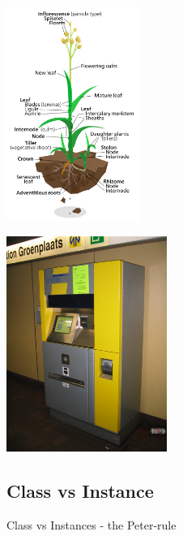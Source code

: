 \begin{frame}{}
	\begin{center}
		\includegraphics[height=7cm]{res/grass-plant.png}
	\end{center}
\end{frame}

\begin{frame}{}
	\begin{center}
		\includegraphics[height=7cm]{res/ticket-vending-machine.jpg}
	\end{center}
\end{frame}

\subsection{Class vs Instance}

\begin{frame}{}
	\begin{center}
		{\huge Class vs Instances - the Peter-rule}
	\end{center}
\end{frame}

